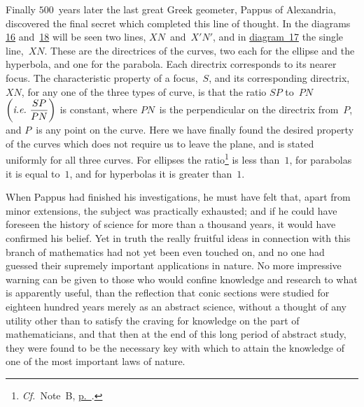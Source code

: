 \documentclass[12pt,leqno]{book}[2005/09/16]
\newcommand{\Chg}[2]{#2}
\newcommand{\FigNum}[1]{\hyperref[fig:#1]{#1}}
\newcommand{\Fig}[2][Fig.]{\hyperref[fig:#2]{#1~#2}}
\newcommand{\Pagelabel}[2][page]{\phantomsection\label{#1:#2}}
\newcommand{\Pageref}[2][p.]{\hyperref[page:#2]{#1~\pageref*{page:#2}}}
\newcommand{\PageSep}[1]{\ignorespaces}
\newcommand{\Cf}{\emph{Cf.}}
\newcommand{\ie}{\emph{i.e.}}
\begin{document}
Finally $500$~years later the last great Greek
geometer, Pappus of Alexandria, discovered
%
the final secret which completed this line of
thought. In the diagrams \FigNum{16} and~\FigNum{18} will be
seen two lines, $XN$~and~$X'N'$, and in \Fig[diagram]{17}
the single line,~$XN$. These are the directrices
of the curves, two each for the ellipse
and the hyperbola, and one for the parabola.
Each directrix corresponds to its nearer focus.
%
%
The characteristic property of a focus,~$S$, and
its corresponding directrix,~$XN$, for any one
of the three types of curve, is that the ratio
\PageSep{136}
$SP$ to~$PN$ $\left(\ie\ \dfrac{SP}{PN}\right)$ is constant, where $PN$~is
the perpendicular on the directrix from~$P$,
and $P$~is any point on the curve. Here we
have finally found the desired property of the
curves which does not require us to leave
the plane, and is stated uniformly for all
three curves. For ellipses the ratio\footnote
  {\Chg{Cf.}{\Cf}\ Note~B, \Pageref{noteB}.\Pagelabel{136}}
is less
than~$1$, for parabolas it is equal to~$1$, and for
hyperbolas it is greater than~$1$.

When Pappus had finished his investigations,
%
he must have felt that, apart from
minor extensions, the subject was practically
exhausted; and if he could have foreseen
the history of science for more than a thousand
years, it would have confirmed his belief.
Yet in truth the really fruitful ideas in connection
with this branch of mathematics had
not yet been even touched on, and no one
had guessed their supremely important applications
in nature. No more impressive
warning can be given to those who would
confine knowledge and research to what is
apparently useful, than the reflection that
conic sections were studied for eighteen hundred
years merely as an abstract science,
without a thought of any utility other than
to satisfy the craving for knowledge on the
part of mathematicians, and that then at the
end of this long period of abstract study, they
\PageSep{137}
were found to be the necessary key with
which to attain the knowledge of one of the
most important laws of nature.
\end{document}
